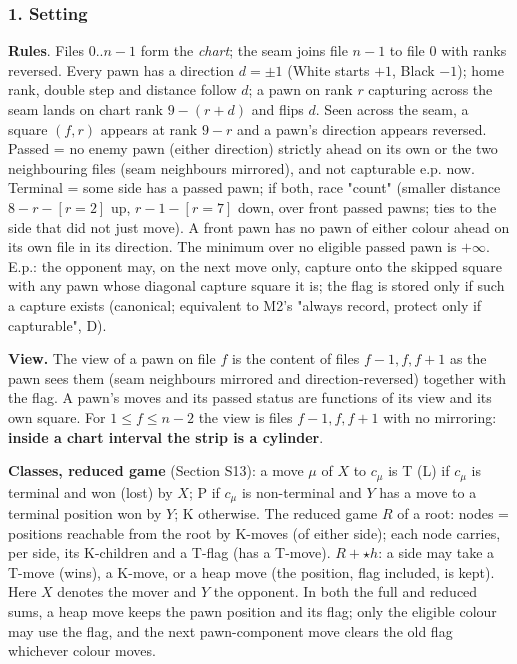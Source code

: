 \subsubsection*{1. Setting}
\textbf{Rules}. Files $0..n-1$ form the \emph{chart}; the seam joins file $n-1$ to file $0$ with ranks reversed. Every pawn has a direction $d=\pm1$ (White starts $+1$, Black $-1$); home rank, double step and distance follow $d$; a pawn on rank $r$ capturing across the seam lands on chart rank $9-(r+d)$ and flips $d$. Seen across the seam, a square $(f,r)$ appears at rank $9-r$ and a pawn's direction appears reversed. Passed = no enemy pawn (either direction) strictly ahead on its own or the two neighbouring files (seam neighbours mirrored), and not capturable e.p. now. Terminal = some side has a passed pawn; if both, race "count" (smaller distance $8-r-[r=2]$ up, $r-1-[r=7]$ down, over front passed pawns; ties to the side that did not just move). A front pawn has no pawn of either colour ahead on its own file in its direction. The minimum over no eligible passed pawn is $+\infty$. E.p.: the opponent may, on the next move only, capture onto the skipped square with any pawn whose diagonal capture square it is; the flag is stored only if such a capture exists (canonical; equivalent to M2's "always record, protect only if capturable", D).

\textbf{View.} The view of a pawn on file $f$ is the content of files $f-1,f,f+1$ as the pawn sees them (seam neighbours mirrored and direction-reversed) together with the flag. A pawn's moves and its passed status are functions of its view and its own square. For $1\le f\le n-2$ the view is files $f-1,f,f+1$ with no mirroring: \textbf{inside a chart interval the strip is a cylinder}.

\textbf{Classes, reduced game} (Section S13): a move $\mu$ of $X$ to $c_\mu$ is T (L) if $c_\mu$ is terminal and won (lost) by $X$; P if $c_\mu$ is non-terminal and $Y$ has a move to a terminal position won by $Y$; K otherwise. The reduced game $R$ of a root: nodes = positions reachable from the root by K-moves (of either side); each node carries, per side, its K-children and a T-flag (has a T-move). $R+\star h$: a side may take a T-move (wins), a K-move, or a heap move (the position, flag included, is kept). Here $X$ denotes the mover and $Y$ the opponent. In both the full and reduced sums, a heap move keeps the pawn position and its flag; only the eligible colour may use the flag, and the next pawn-component move clears the old flag whichever colour moves.

